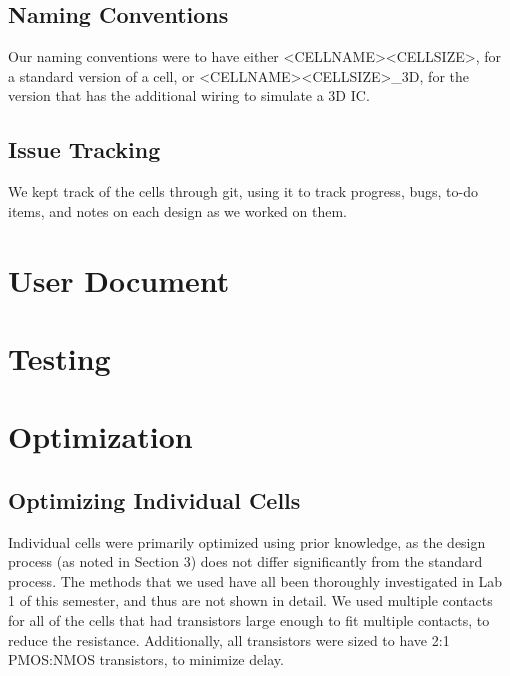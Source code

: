 \documentclass{article}
\begin{document}
\subsection{Naming Conventions} Our naming conventions were to have either \textless CELLNAME\textgreater \textless CELLSIZE\textgreater, for a standard version of a cell, or \textless CELLNAME\textgreater \textless CELLSIZE\textgreater\_3D, for the version that has the additional wiring to simulate a 3D IC. 
\subsection{Issue Tracking} We kept track of the cells through git, using it to track progress, bugs, to-do items, and notes on each design as we worked on them. 


\section{User Document}

\section{Testing}\label{sec:testing}

\section{Optimization}
\subsection{Optimizing Individual Cells}
Individual cells were primarily optimized using prior knowledge, as the design process (as noted in Section 3) does not differ significantly from the standard process. The methods that we used have all been thoroughly investigated in Lab 1 of this semester, and thus are not shown in detail. We used multiple contacts for all of the cells that had transistors large enough to fit multiple contacts, to reduce the resistance. Additionally, all transistors were sized to have 2:1 PMOS:NMOS transistors, to minimize delay. 
\end{document}
